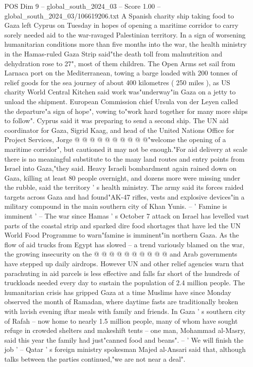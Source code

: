 \begin{textsample}{POS Dim 9 – global\_south\_2024\_03 – Score 1.00 – global\_south\_2024\_03/106619206.txt}  \label{ex:f9_pos_074}
A Spanish charity ship taking food to Gaza left Cyprus on Tuesday in hopes of opening a maritime corridor to carry sorely needed aid to the war-ravaged Palestinian territory.
In a sign of worsening humanitarian conditions more than five months into the war, the health ministry in the Hamas-ruled Gaza Strip said"the death toll from malnutrition and dehydration rose to 27", most of them children.
The Open Arms set sail from Larnaca port on the Mediterranean, towing a barge loaded with 200 tonnes of relief goods for the sea journey of about 400 kilometres ( 250 miles ), as US charity World Central Kitchen said work was"underway"in Gaza on a jetty to unload the shipment.
European Commission chief Ursula von der Leyen called the departure"a sign of hope", vowing to"work hard together for many more ships to follow".
Cyprus said it was preparing to send a second ship.
The UN aid coordinator for Gaza, Sigrid Kaag, and head of the United Nations Office for Project Services, Jorge @ @ @ @ @ @ @ @ @ @"welcome the opening of a maritime corridor", but cautioned it may not be enough."For aid delivery at scale there is no meaningful substitute to the many land routes and entry points from Israel into Gaza,"they said.
Heavy Israeli bombardment again rained down on Gaza, killing at least 80 people overnight, and dozens more were missing under the rubble, said the territory ' s health ministry.
The army said its forces raided targets across Gaza and had found"AK-47 rifles, vests and explosive devices"in a military compound in the main southern city of Khan Yunis. -- ' Famine is imminent ' -- The war since Hamas ' s October 7 attack on Israel has levelled vast parts of the coastal strip and sparked dire food shortages that have led the UN World Food Programme to warn"famine is imminent"in northern Gaza.
As the flow of aid trucks from Egypt has slowed -- a trend variously blamed on the war, the growing insecurity on the @ @ @ @ @ @ @ @ @ @ and Arab governments have stepped up daily airdrops.
However UN and other relief agencies warn that parachuting in aid parcels is less effective and falls far short of the hundreds of truckloads needed every day to sustain the population of 2.4 million people.
The humanitarian crisis has gripped Gaza at a time Muslims have since Monday observed the month of Ramadan, where daytime fasts are traditionally broken with lavish evening iftar meals with family and friends.
In Gaza ' s southern city of Rafah -- now home to nearly 1.5 million people, many of whom have sought refuge in crowded shelters and makeshift tents -- one man, Mohammad al-Masry, said this year the family had just"canned food and beans". -- ' We will finish the job ' -- Qatar ' s foreign ministry spokesman Majed al-Ansari said that, although talks between the parties continued,"we are not near a deal".

\end{textsample}
